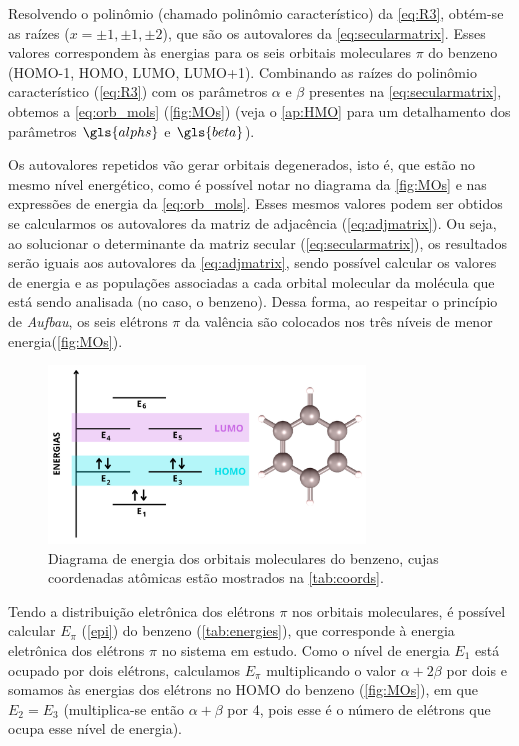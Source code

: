 Resolvendo o polinômio (chamado polinômio característico) da \autoref{eq:R3}, obtém-se as raízes ($x = \pm 1, \pm 1, \pm 2$), que são os autovalores da \autoref{eq:secularmatrix}. Esses valores correspondem às energias para os seis orbitais moleculares $\pi$ do benzeno (\gls{HOMO}-1, \gls{HOMO}, \gls{LUMO}, \gls{LUMO}+1). Combinando as raízes do polinômio característico (\autoref{eq:R3}) com os parâmetros $\alpha$ e $\beta$ presentes na \autoref{eq:secularmatrix}, obtemos a \autoref{eq:orb_mols} (\autoref{fig:MOs}) (veja o \autoref{ap:HMO} para um detalhamento dos parâmetros $\gls{alphs}$ e $\gls{beta}$).

Os autovalores repetidos vão gerar orbitais degenerados, isto é, que estão no mesmo nível energético, como é possível notar no diagrama da \autoref{fig:MOs} e nas expressões de energia da \autoref{eq:orb_mols}. Esses mesmos valores podem ser obtidos se calcularmos os autovalores da matriz de adjacência (\autoref{eq:adjmatrix}). Ou seja, ao solucionar o determinante da matriz secular (\autoref{eq:secularmatrix}), os resultados serão iguais aos autovalores da \autoref{eq:adjmatrix}, sendo possível calcular os valores de energia e as populações associadas a cada orbital molecular da molécula que está sendo analisada (no caso, o benzeno). Dessa forma, ao respeitar o princípio de \textit{Aufbau}, os seis elétrons $\pi$ da valência são colocados nos três níveis de menor energia(\autoref{fig:MOs}).

\begin{figure}[htb]
\caption{\label{fig:MOs} Diagrama de energia dos orbitais moleculares do benzeno, cujas coordenadas atômicas estão mostrados na \autoref{tab:coords}.}
	\begin{center}
		\includegraphics[width=0.75\textwidth]{images/MOs.png}
	\end{center}
\end{figure}

Tendo a distribuição eletrônica dos elétrons $\pi$ nos orbitais moleculares, é possível calcular $E_\pi$ (\autoref{epi}) do benzeno (\autoref{tab:energies}), que corresponde à energia eletrônica dos elétrons $\pi$ no sistema em estudo. Como o nível de energia $E_1$ está ocupado por dois elétrons, calculamos $E_\pi$ multiplicando o valor $\alpha + 2 \beta$ por dois e somamos às energias dos elétrons no \gls{HOMO} do benzeno (\autoref{fig:MOs}), em que $E_2 = E_3$ (multiplica-se então $\alpha + \beta$ por 4, pois esse é o número de elétrons que ocupa esse nível de energia).


